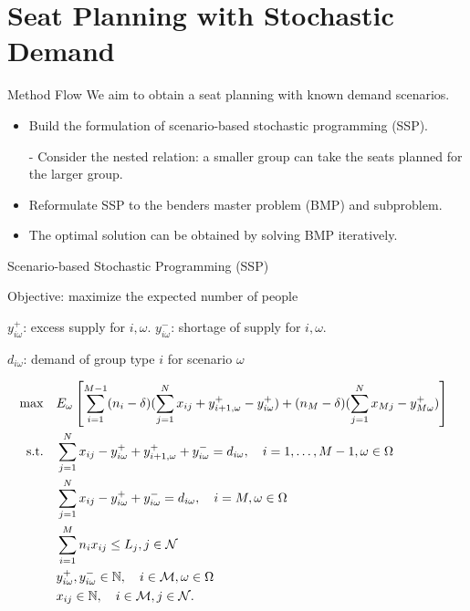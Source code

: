 
\section{Seat Planning with Stochastic Demand}
    \frame{\sectionpage}

    \begin{frame}{Method Flow}
      We aim to obtain a seat planning with known demand scenarios.
      \begin{itemize}
        \item Build the formulation of scenario-based stochastic programming (SSP).
        \item[-] Consider the nested relation: a smaller group can take the seats planned for the larger group.
        \item Reformulate SSP to the benders master problem (BMP) and subproblem.
        \item The optimal solution can be obtained by solving BMP iteratively. 
      \end{itemize}
    \end{frame}

    \begin{frame}{Scenario-based Stochastic Programming (SSP)}
      \begin{scriptsize}
        Objective: maximize the expected number of people

        $y_{i \omega}^{+}$: excess supply for $i, \omega$. $y_{i \omega}^{-}$: shortage of supply for $i, \omega$.

        $d_{i \omega}$: demand of group type $i$ for scenario $\omega$

      \begin{equation}\label{sto_form}
        \begin{aligned}
        \hspace{-10mm}
        \max \quad & E_{\omega}\left[\sum_{i=1}^{M-1} (n_i-\delta) (\sum_{j= 1}^{N} x_{ij} + y_{i+1,\omega}^{+} - y_{i \omega}^{+}) + (n_{M}-\delta) (\sum_{j= 1}^{N} x_{Mj} - y_{M \omega}^{+})\right] \\
        \text {s.t.} \quad & \sum_{j= 1}^{N} x_{ij}-y_{i \omega}^{+}+
        y_{i+1, \omega}^{+} + y_{i \omega}^{-}=d_{i \omega}, \quad i = 1,\ldots,M-1, \omega \in \Omega \\
        & \sum_{j= 1}^{N} x_{ij} -y_{i \omega}^{+}+y_{i \omega}^{-}=d_{i \omega}, \quad i = M, \omega \in \Omega \\
        & \sum_{i=1}^{M} n_{i} x_{ij} \leq L_j, j \in \mathcal{N}\\
        & y_{i \omega}^{+}, y_{i \omega}^{-} \in \mathbb{N}, \quad i \in \mathcal{M}, \omega \in \Omega \\
        & x_{ij} \in \mathbb{N}, \quad i \in \mathcal{M}, j \in \mathcal{N}.
        \end{aligned}
      \end{equation}
      \end{scriptsize}
    
    \end{frame}

